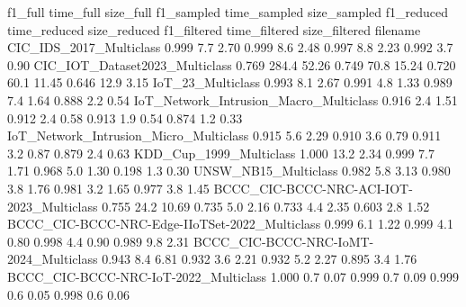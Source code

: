                                                                    f1_full time_full size_full f1_sampled time_sampled size_sampled f1_reduced time_reduced size_reduced f1_filtered time_filtered size_filtered
filename                                                                                                                                                                                                         
CIC_IDS_2017_Multiclass                                               0.999       7.7      2.70      0.999          8.6         2.48      0.997          8.8         2.23       0.992           3.7          0.90
CIC_IOT_Dataset2023_Multiclass                                        0.769     284.4     52.26      0.749         70.8        15.24      0.720         60.1        11.45       0.646          12.9          3.15
IoT_23_Multiclass                                                     0.993       8.1      2.67      0.991          4.8         1.33      0.989          7.4         1.64       0.888           2.2          0.54
IoT_Network_Intrusion_Macro_Multiclass                                0.916       2.4      1.51      0.912          2.4         0.58      0.913          1.9         0.54       0.874           1.2          0.33
IoT_Network_Intrusion_Micro_Multiclass                                0.915       5.6      2.29      0.910          3.6         0.79      0.911          3.2         0.87       0.879           2.4          0.63
KDD_Cup_1999_Multiclass                                               1.000      13.2      2.34      0.999          7.7         1.71      0.968          5.0         1.30       0.198           1.3          0.30
UNSW_NB15_Multiclass                                                  0.982       5.8      3.13      0.980          3.8         1.76      0.981          3.2         1.65       0.977           3.8          1.45
BCCC_CIC-BCCC-NRC-ACI-IOT-2023_Multiclass                             0.755      24.2     10.69      0.735          5.0         2.16      0.733          4.4         2.35       0.603           2.8          1.52
BCCC_CIC-BCCC-NRC-Edge-IIoTSet-2022_Multiclass                        0.999       6.1      1.22      0.999          4.1         0.80      0.998          4.4         0.90       0.989           9.8          2.31
BCCC_CIC-BCCC-NRC-IoMT-2024_Multiclass                                0.943       8.4      6.81      0.932          3.6         2.21      0.932          5.2         2.27       0.895           3.4          1.76
BCCC_CIC-BCCC-NRC-IoT-2022_Multiclass                                 1.000       0.7      0.07      0.999          0.7         0.09      0.999          0.6         0.05       0.998           0.6          0.06
